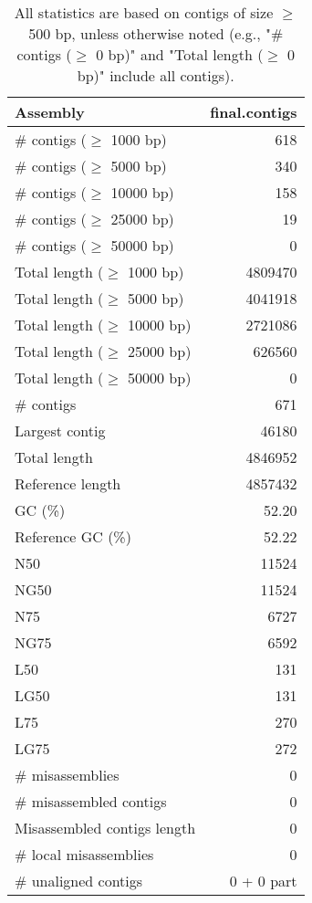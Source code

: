 \documentclass[12pt,a4paper]{article}
\begin{document}
\begin{table}[ht]
\begin{center}
\caption{All statistics are based on contigs of size $\geq$ 500 bp, unless otherwise noted (e.g., "\# contigs ($\geq$ 0 bp)" and "Total length ($\geq$ 0 bp)" include all contigs).}
\begin{tabular}{|l*{1}{|r}|}
\hline
Assembly & final.contigs \\ \hline
\# contigs ($\geq$ 1000 bp) & 618 \\ \hline
\# contigs ($\geq$ 5000 bp) & 340 \\ \hline
\# contigs ($\geq$ 10000 bp) & 158 \\ \hline
\# contigs ($\geq$ 25000 bp) & 19 \\ \hline
\# contigs ($\geq$ 50000 bp) & 0 \\ \hline
Total length ($\geq$ 1000 bp) & 4809470 \\ \hline
Total length ($\geq$ 5000 bp) & 4041918 \\ \hline
Total length ($\geq$ 10000 bp) & 2721086 \\ \hline
Total length ($\geq$ 25000 bp) & 626560 \\ \hline
Total length ($\geq$ 50000 bp) & 0 \\ \hline
\# contigs & 671 \\ \hline
Largest contig & 46180 \\ \hline
Total length & 4846952 \\ \hline
Reference length & 4857432 \\ \hline
GC (\%) & 52.20 \\ \hline
Reference GC (\%) & 52.22 \\ \hline
N50 & 11524 \\ \hline
NG50 & 11524 \\ \hline
N75 & 6727 \\ \hline
NG75 & 6592 \\ \hline
L50 & 131 \\ \hline
LG50 & 131 \\ \hline
L75 & 270 \\ \hline
LG75 & 272 \\ \hline
\# misassemblies & 0 \\ \hline
\# misassembled contigs & 0 \\ \hline
Misassembled contigs length & 0 \\ \hline
\# local misassemblies & 0 \\ \hline
\# unaligned contigs & 0 + 0 part \\ \hline

\end{tabular}
\end{center}
\end{table}
\end{document}
